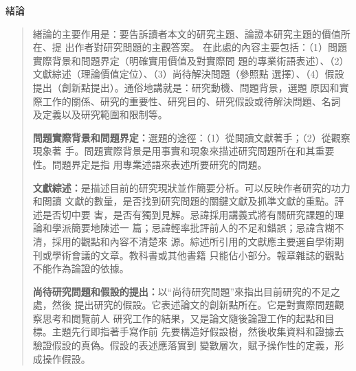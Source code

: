 \documentclass[
    writingLanguage=chinese, %
    addPageTitle=on,  %
    addDeclaration=on, %
    addMUSTlog=on, %
    addFigTOC=on, %
    addTabTOC=on, %
    refIndent=off, %
    printMod=off, %
]{must}
\begin{document}
\noindent\faHandORight 緒論
\begin{quote}
緒論的主要作用是：要告訴讀者本文的研究主題、論證本研究主題的價值所在、提
出作者對研究問題的主觀答案。
在此處的內容主要包括：（1）問題實際背景和問題界定（明確實用價值及對實際問
題的專業術語表述）、（2）文獻綜述（理論價值定位）、（3）尚待解決問題（參照點
選擇）、（4）假設提出（創新點提出）。通俗地講就是：研究動機、問題背景，選題
原因和實際工作的關係、研究的重要性、研究目的、研究假設或待解決問題、名詞
及定義以及研究範圍和限制等。

\textbf{問題實際背景和問題界定：}選題的途徑：（1）從閲讀文獻著手；（2）從觀察現象著
手。問題實際背景是用事實和現象來描述研究問題所在和其重要性。問題界定是指
用專業述語來表述所要研究的問題。

\textbf{文獻綜述：}是描述目前的研究現狀並作簡要分析。可以反映作者研究的功力和閲讀
文獻的數量，是否找到研究問題的關鍵文獻及抓準文獻的重點。評述是否切中要
害，是否有獨到見解。忌諱採用講義式將有關研究課題的理論和學派簡要地陳述一
篇；忌諱輕率批評前人的不足和錯誤；忌諱含糊不清，採用的觀點和內容不清楚來
源。綜述所引用的文獻應主要選自學術期刊或學術會議的文章。教科書或其他書籍
只能佔小部分。報章雜誌的觀點不能作為論證的依據。

\textbf{尚待研究問題和假設的提出：}以“尚待研究問題”來指出目前研究的不足之處，然後
提出研究的假設。它表述論文的創新點所在。它是對實際問題觀察思考和閲覽前人
研究工作的結果，又是論文隨後論證工作的起點和目標。主題先行即指著手寫作前
先要構造好假設樹，然後收集資料和證據去驗證假設的真偽。假設的表述應落實到
變數層次，賦予操作性的定義，形成操作假設。

\end{quote}
\end{document}

